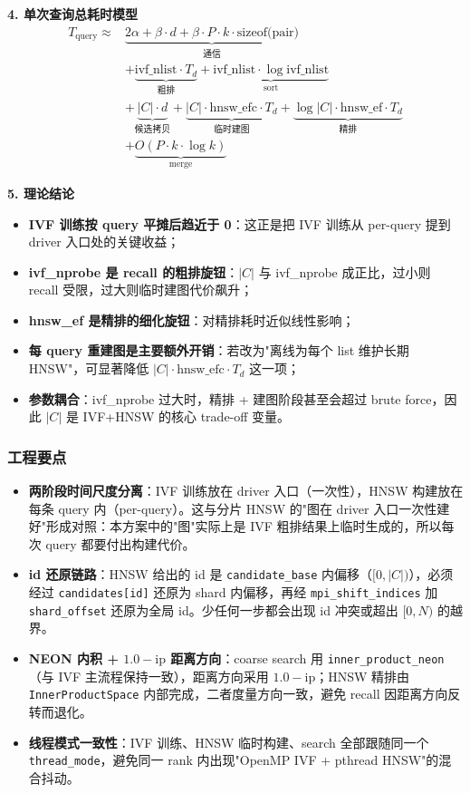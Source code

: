 \documentclass[a4paper]{article}
\begin{document}
\textbf{4. 单次查询总耗时模型}
\begin{align}
T_{\text{query}} \approx & \underbrace{2\alpha + \beta \cdot d + \beta \cdot P \cdot k \cdot \text{sizeof(pair)}}_{\text{通信}} \nonumber \\
& + \underbrace{\text{ivf\_nlist} \cdot T_d}_{\text{粗排}} + \underbrace{\text{ivf\_nlist} \cdot \log \text{ivf\_nlist}}_{\text{sort}} \nonumber \\
& + \underbrace{|C| \cdot d}_{\text{候选拷贝}} + \underbrace{|C| \cdot \text{hnsw\_efc} \cdot T_d}_{\text{临时建图}} + \underbrace{\log |C| \cdot \text{hnsw\_ef} \cdot T_d}_{\text{精排}} \nonumber \\
& + \underbrace{O(P \cdot k \cdot \log k)}_{\text{merge}}
\end{align}

\textbf{5. 理论结论}
\begin{itemize}
    \item \textbf{IVF 训练按 query 平摊后趋近于 0}：这正是把 IVF 训练从 per-query 提到 driver 入口处的关键收益；
    \item \textbf{ivf\_nprobe 是 recall 的粗排旋钮}：$|C|$ 与 ivf\_nprobe 成正比，过小则 recall 受限，过大则临时建图代价飙升；
    \item \textbf{hnsw\_ef 是精排的细化旋钮}：对精排耗时近似线性影响；
    \item \textbf{每 query 重建图是主要额外开销}：若改为"离线为每个 list 维护长期 HNSW"，可显著降低 $|C| \cdot \text{hnsw\_efc} \cdot T_d$ 这一项；
    \item \textbf{参数耦合}：ivf\_nprobe 过大时，精排 + 建图阶段甚至会超过 brute force，因此 $|C|$ 是 IVF+HNSW 的核心 trade-off 变量。
\end{itemize}

\subsubsection{工程要点}
\begin{itemize}
    \item \textbf{两阶段时间尺度分离}：IVF 训练放在 driver 入口（一次性），HNSW 构建放在每条 query 内（per-query）。这与分片 HNSW 的"图在 driver 入口一次性建好"形成对照：本方案中的"图"实际上是 IVF 粗排结果上临时生成的，所以每次 query 都要付出构建代价。
    \item \textbf{id 还原链路}：HNSW 给出的 id 是 \texttt{candidate\_base} 内偏移（$[0, |C|)$），必须经过 \texttt{candidates[id]} 还原为 shard 内偏移，再经 \texttt{mpi\_shift\_indices} 加 \texttt{shard\_offset} 还原为全局 id。少任何一步都会出现 id 冲突或超出 $[0, N)$ 的越界。
    \item \textbf{NEON 内积 + $1.0 - \text{ip}$ 距离方向}：coarse search 用 \texttt{inner\_product\_neon}（与 IVF 主流程保持一致），距离方向采用 $1.0 - \text{ip}$；HNSW 精排由 \texttt{InnerProductSpace} 内部完成，二者度量方向一致，避免 recall 因距离方向反转而退化。
    \item \textbf{线程模式一致性}：IVF 训练、HNSW 临时构建、search 全部跟随同一个 \texttt{thread\_mode}，避免同一 rank 内出现"OpenMP IVF + pthread HNSW"的混合抖动。
\end{itemize}
\end{document}
